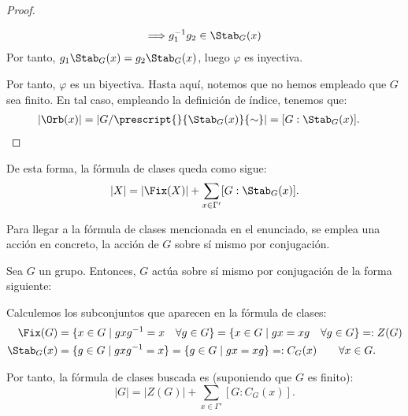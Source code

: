 \begin{ejercicio}
\begin{prop}
\begin{proof}
\begin{itemize}
\begin{align*}
                    \Longrightarrow g_1^{-1}g_2\in \Stab_G(x)
                \end{align*}
                Por tanto, $g_1\Stab_G(x) = g_2\Stab_G(x)$, luego \(\varphi\) es inyectiva.
            \end{itemize}
            Por tanto, \(\varphi\) es un biyectiva. Hasta aquí, notemos que no hemos empleado que \(G\) sea finito. En tal caso, empleando la definición de índice, tenemos que:
            \begin{align*}
                |\Orb(x)| &= |G/\prescript{}{\Stab_G(x)}{\sim}|= [G: \Stab_G(x)].
            \end{align*}
        \end{proof}
    \end{prop}

    De esta forma, la fórmula de clases queda como sigue:
    \begin{equation*}
        |X| = |\Fix(X)| + \sum_{x\in \Gamma'} [G: \Stab_G(x)].
    \end{equation*}

    Para llegar a la fórmula de clases mencionada en el enunciado, se emplea una acción en concreto, la acción de \(G\) sobre sí mismo por conjugación.
    \begin{prop}
        Sea \(G\) un grupo. Entonces, \(G\) actúa sobre sí mismo por conjugación de la forma siguiente:
    \end{prop}

    Calculemos los subconjuntos que aparecen en la fórmula de clases:
    \begin{align*}
        \Fix(G) &= \{x\in G \mid g x g^{-1} = x\quad \forall g\in G\}
        = \{x\in G \mid g x= x g\quad \forall g\in G\} =: Z(G)\\
        \Stab_G(x) &= \{g\in G \mid g x g^{-1} = x\}
        = \{g\in G \mid g x = x g\} =: C_G(x)\qquad \forall x\in G.
    \end{align*}

    Por tanto, la fórmula de clases buscada es (suponiendo que $G$ es finito):
    \begin{equation*}
        |G| = |Z(G)| + \sum_{x\in \Gamma'} [G: C_G(x)].
    \end{equation*}
\end{ejercicio}


